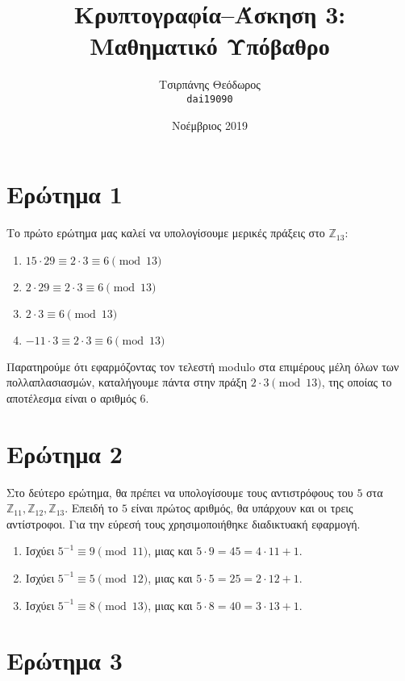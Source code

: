 \documentclass{article}
\title{Κρυπτογραφία--Άσκηση 3: Μαθηματικό Υπόβαθρο}
\author{Τσιρπάνης Θεόδωρος\\ \texttt{dai19090}}
\date{Νοέμβριος 2019}
\begin{document}
\maketitle

\section*{Ερώτημα 1}

Το πρώτο ερώτημα μας καλεί να υπολογίσουμε μερικές πράξεις στο $\mathbb{Z}_{13}$:

\begin{enumerate}
    \item $15 \cdot 29 \equiv 2 \cdot 3 \equiv 6 \pmod{13}$
    \item $2 \cdot 29 \equiv 2 \cdot 3 \equiv 6 \pmod{13}$
    \item $2 \cdot 3 \equiv 6 \pmod{13}$
    \item $-11 \cdot 3 \equiv 2 \cdot 3  \equiv 6 \pmod{13}$
\end{enumerate}

Παρατηρούμε ότι εφαρμόζοντας τον τελεστή modulo στα επιμέρους μέλη όλων των πολλαπλασιασμών, καταλήγουμε πάντα στην πράξη $2 \cdot 3 \pmod{13}$, της οποίας το αποτέλεσμα είναι ο αριθμός $6$.

\section*{Ερώτημα 2}

Στο δεύτερο ερώτημα, θα πρέπει να υπολογίσουμε τους αντιστρόφους του $5$ στα $\mathbb{Z}_{11}, \mathbb{Z}_{12}, \mathbb{Z}_{13}$. Επειδή το $5$ είναι πρώτος αριθμός, θα υπάρχουν και οι τρεις αντίστροφοι. Για την εύρεσή τους χρησιμοποιήθηκε διαδικτυακή εφαρμογή\cite{inversemod}.

\begin{enumerate}
    \item Ισχύει $5^{-1} \equiv 9 \pmod{11}$, μιας και $5 \cdot 9 = 45 = 4 \cdot 11 + 1$.
    \item Ισχύει $5^{-1} \equiv 5 \pmod{12}$, μιας και $5 \cdot 5 = 25 = 2 \cdot 12 + 1$.
    \item Ισχύει $5^{-1} \equiv 8 \pmod{13}$, μιας και $5 \cdot 8 = 40 = 3 \cdot 13 + 1$.
\end{enumerate}

\section*{Ερώτημα 3}
\end{document}
